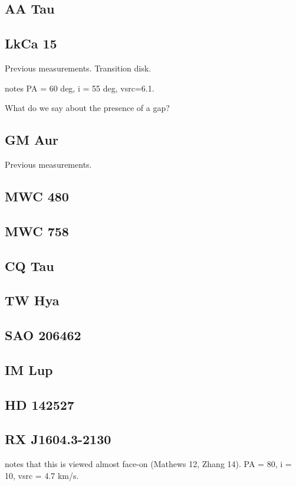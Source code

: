 \documentclass[iop,floatfix,numberedappendix,twocolappendix]{emulateapj}
\begin{document}
\subsection{AA Tau}

\subsection{LkCa 15}
Previous measurements. Transition disk.

\citep{vandermarel15} notes PA = 60 deg, i = 55 deg,  vsrc=6.1.

What do we say about the presence of a gap?

\subsection{GM Aur}
Previous measurements.

\subsection{MWC 480}

\subsection{MWC 758}

\subsection{CQ Tau}

\subsection{TW Hya}

\subsection{SAO 206462}

\subsection{IM Lup}

\subsection{HD 142527}

\subsection{RX J1604.3-2130}
\citep{vandermarel15} notes that this is viewed almost face-on (Mathews 12, Zhang 14). PA = 80, i = 10, vsrc = 4.7 km/s.
\end{document}
